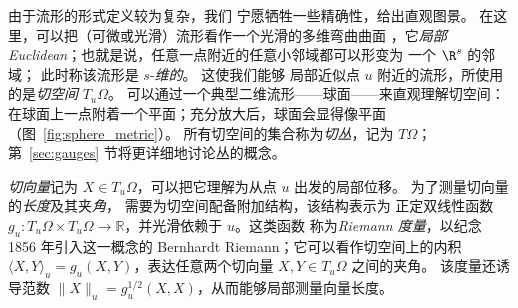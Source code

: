 由于流形的形式定义较为复杂，我们
宁愿牺牲一些精确性，给出直观图景。
%
在这里，可以把（可微或光滑）流形看作一个光滑的多维弯曲曲面%
，它\emph{局部 Euclidean}；也就是说，任意一点附近的任意小邻域都可以形变为
一个 $\R^s$ 的邻域；
%
此时称该流形是 $s$-{\em 维的}。
%
%
%
这使我们能够
局部近似点 $u$ 附近的流形，所使用的是\emph{切空间} $T_u\Omega$。%
可以通过一个典型二维流形——球面——来直观理解切空间：在球面上一点附着一个平面；充分放大后，球面会显得像平面（图~\ref{fig:sphere_metric}）。
%
所有切空间的集合称为{\em 切丛}，记为 $T\Omega$；第~\ref{sec:gauges} 节将更详细地讨论丛的概念。



{\em 切向量}记为 $X\in T_u\Omega$，可以把它理解为从点 $u$ 出发的局部位移。
为了测量切向量的\emph{长度}及其夹\emph{角}，%
%
%
需要为切空间配备附加结构，该结构表示为
正定双线性函数
$g_u: T_u\Omega \times T_u\Omega \rightarrow \mathbb{R}$，并光滑依赖于 $u$。这类函数
称为{\em Riemann 度量}，以纪念 1856 年引入这一概念的 Bernhardt Riemann；它可以看作切空间上的内积 $\langle X, Y \rangle_u = g_u(X,Y)$，表达任意两个切向量 $X, Y \in T_u\Omega$ 之间的夹角。
%
该度量还诱导范数 $\| X \|_u = g_u^{1/2}(X,X)$，从而能够局部测量向量长度。



